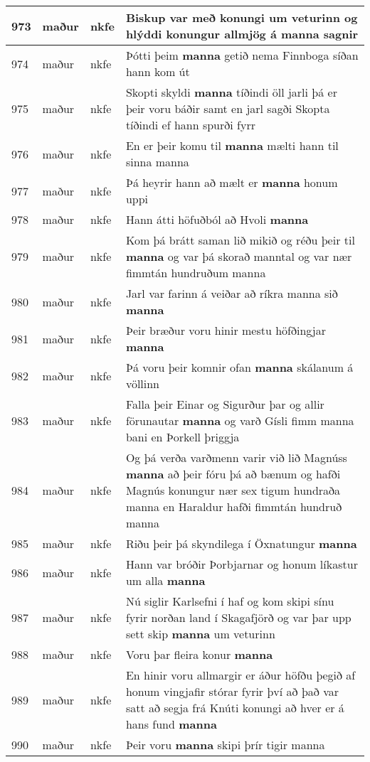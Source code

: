 \documentclass{article}
\begin{document}
\begin{longtable}{p{1cm}|p{1cm}|p{1cm}|p{13cm}}
\hline
973&maður&nkfe&Biskup var með konungi um veturinn og hlýddi konungur allmjög á \textbf{manna} sagnir\\
\hline
974&maður&nkfe&Þótti þeim \textbf{manna} getið nema Finnboga síðan hann kom út\\
\hline
975&maður&nkfe&Skopti skyldi \textbf{manna} tíðindi öll jarli þá er þeir voru báðir samt en jarl sagði Skopta tíðindi ef hann spurði fyrr\\
\hline
976&maður&nkfe&En er þeir komu til \textbf{manna} mælti hann til sinna manna\\
\hline
977&maður&nkfe&Þá heyrir hann að mælt er \textbf{manna} honum uppi\\
\hline
978&maður&nkfe&Hann átti höfuðból að Hvoli \textbf{manna} \\
\hline
979&maður&nkfe&Kom þá brátt saman lið mikið og réðu þeir til \textbf{manna} og var þá skorað manntal og var nær fimmtán hundruðum manna\\
\hline
980&maður&nkfe&Jarl var farinn á veiðar að ríkra manna sið \textbf{manna} \\
\hline
981&maður&nkfe&Þeir bræður voru hinir mestu höfðingjar \textbf{manna} \\
\hline
982&maður&nkfe&Þá voru þeir komnir ofan \textbf{manna} skálanum á völlinn\\
\hline
983&maður&nkfe&Falla þeir Einar og Sigurður þar og allir förunautar \textbf{manna} og varð Gísli fimm manna bani en Þorkell þriggja\\
\hline
984&maður&nkfe&Og þá verða varðmenn varir við lið Magnúss \textbf{manna} að þeir fóru þá að bænum og hafði Magnús konungur nær sex tigum hundraða manna en Haraldur hafði fimmtán hundruð manna\\
\hline
985&maður&nkfe&Riðu þeir þá skyndilega í Öxnatungur \textbf{manna} \\
\hline
986&maður&nkfe&Hann var bróðir Þorbjarnar og honum líkastur um alla \textbf{manna} \\
\hline
987&maður&nkfe&Nú siglir Karlsefni í haf og kom skipi sínu fyrir norðan land í Skagafjörð og var þar upp sett skip \textbf{manna} um veturinn\\
\hline
988&maður&nkfe&Voru þar fleira konur \textbf{manna} \\
\hline
989&maður&nkfe&En hinir voru allmargir er áður höfðu þegið af honum vingjafir stórar fyrir því að það var satt að segja frá Knúti konungi að hver er á hans fund \textbf{manna} \\
\hline
990&maður&nkfe&Þeir voru \textbf{manna} skipi þrír tigir manna\\

\end{longtable}
\end{document}
